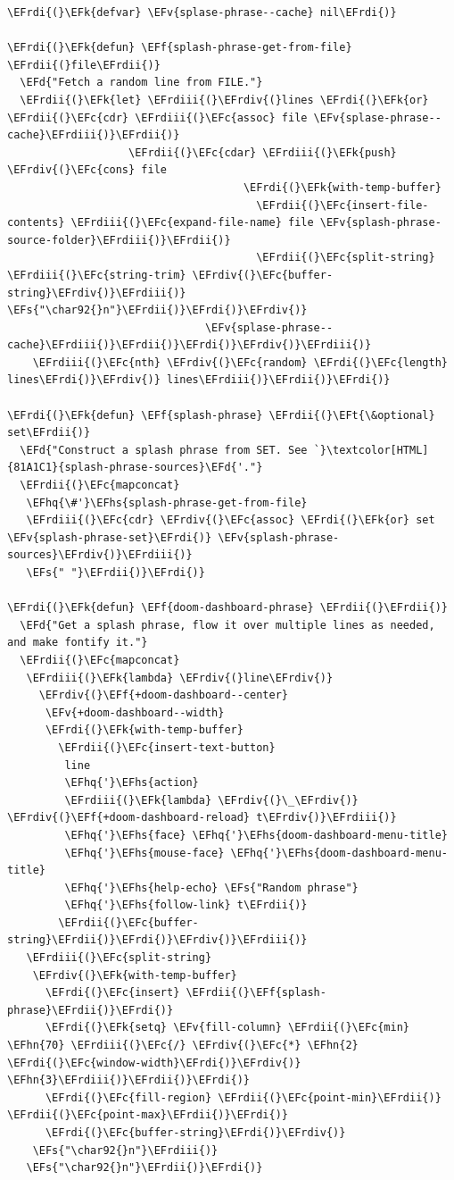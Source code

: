 \documentclass{scrartcl}
\newcommand{\EFk}[1]{\textcolor{EFk}{#1}} %
\newcommand{\EFd}[1]{\textcolor{EFd}{#1}} %
\newcommand{\EFt}[1]{\textcolor{EFt}{#1}} %
\newcommand{\EFs}[1]{\textcolor{EFs}{#1}} %
\newcommand{\EFc}[1]{\textcolor{EFc}{#1}} %
\newcommand{\EFv}[1]{\textcolor{EFv}{#1}} %
\newcommand{\EFf}[1]{\textcolor{EFf}{#1}} %
\newcommand{\EFhn}[1]{#1} %
\newcommand{\EFhq}[1]{#1} %
\newcommand{\EFhs}[1]{#1} %
\newcommand{\EFrdi}[1]{#1} %
\newcommand{\EFrdii}[1]{#1} %
\newcommand{\EFrdiii}[1]{#1} %
\newcommand{\EFrdiv}[1]{#1} %
\begin{document}
\begin{Code}
\begin{Verbatim}[]
\EFrdi{(}\EFk{defvar} \EFv{splase-phrase--cache} nil\EFrdi{)}

\EFrdi{(}\EFk{defun} \EFf{splash-phrase-get-from-file} \EFrdii{(}file\EFrdii{)}
  \EFd{"Fetch a random line from FILE."}
  \EFrdii{(}\EFk{let} \EFrdiii{(}\EFrdiv{(}lines \EFrdi{(}\EFk{or} \EFrdii{(}\EFc{cdr} \EFrdiii{(}\EFc{assoc} file \EFv{splase-phrase--cache}\EFrdiii{)}\EFrdii{)}
                   \EFrdii{(}\EFc{cdar} \EFrdiii{(}\EFk{push} \EFrdiv{(}\EFc{cons} file
                                     \EFrdi{(}\EFk{with-temp-buffer}
                                       \EFrdii{(}\EFc{insert-file-contents} \EFrdiii{(}\EFc{expand-file-name} file \EFv{splash-phrase-source-folder}\EFrdiii{)}\EFrdii{)}
                                       \EFrdii{(}\EFc{split-string} \EFrdiii{(}\EFc{string-trim} \EFrdiv{(}\EFc{buffer-string}\EFrdiv{)}\EFrdiii{)} \EFs{"\char92{}n"}\EFrdii{)}\EFrdi{)}\EFrdiv{)}
                               \EFv{splase-phrase--cache}\EFrdiii{)}\EFrdii{)}\EFrdi{)}\EFrdiv{)}\EFrdiii{)}
    \EFrdiii{(}\EFc{nth} \EFrdiv{(}\EFc{random} \EFrdi{(}\EFc{length} lines\EFrdi{)}\EFrdiv{)} lines\EFrdiii{)}\EFrdii{)}\EFrdi{)}

\EFrdi{(}\EFk{defun} \EFf{splash-phrase} \EFrdii{(}\EFt{\&optional} set\EFrdii{)}
  \EFd{"Construct a splash phrase from SET. See `}\textcolor[HTML]{81A1C1}{splash-phrase-sources}\EFd{'."}
  \EFrdii{(}\EFc{mapconcat}
   \EFhq{\#'}\EFhs{splash-phrase-get-from-file}
   \EFrdiii{(}\EFc{cdr} \EFrdiv{(}\EFc{assoc} \EFrdi{(}\EFk{or} set \EFv{splash-phrase-set}\EFrdi{)} \EFv{splash-phrase-sources}\EFrdiv{)}\EFrdiii{)}
   \EFs{" "}\EFrdii{)}\EFrdi{)}

\EFrdi{(}\EFk{defun} \EFf{doom-dashboard-phrase} \EFrdii{(}\EFrdii{)}
  \EFd{"Get a splash phrase, flow it over multiple lines as needed, and make fontify it."}
  \EFrdii{(}\EFc{mapconcat}
   \EFrdiii{(}\EFk{lambda} \EFrdiv{(}line\EFrdiv{)}
     \EFrdiv{(}\EFf{+doom-dashboard--center}
      \EFv{+doom-dashboard--width}
      \EFrdi{(}\EFk{with-temp-buffer}
        \EFrdii{(}\EFc{insert-text-button}
         line
         \EFhq{'}\EFhs{action}
         \EFrdiii{(}\EFk{lambda} \EFrdiv{(}\_\EFrdiv{)} \EFrdiv{(}\EFf{+doom-dashboard-reload} t\EFrdiv{)}\EFrdiii{)}
         \EFhq{'}\EFhs{face} \EFhq{'}\EFhs{doom-dashboard-menu-title}
         \EFhq{'}\EFhs{mouse-face} \EFhq{'}\EFhs{doom-dashboard-menu-title}
         \EFhq{'}\EFhs{help-echo} \EFs{"Random phrase"}
         \EFhq{'}\EFhs{follow-link} t\EFrdii{)}
        \EFrdii{(}\EFc{buffer-string}\EFrdii{)}\EFrdi{)}\EFrdiv{)}\EFrdiii{)}
   \EFrdiii{(}\EFc{split-string}
    \EFrdiv{(}\EFk{with-temp-buffer}
      \EFrdi{(}\EFc{insert} \EFrdii{(}\EFf{splash-phrase}\EFrdii{)}\EFrdi{)}
      \EFrdi{(}\EFk{setq} \EFv{fill-column} \EFrdii{(}\EFc{min} \EFhn{70} \EFrdiii{(}\EFc{/} \EFrdiv{(}\EFc{*} \EFhn{2} \EFrdi{(}\EFc{window-width}\EFrdi{)}\EFrdiv{)} \EFhn{3}\EFrdiii{)}\EFrdii{)}\EFrdi{)}
      \EFrdi{(}\EFc{fill-region} \EFrdii{(}\EFc{point-min}\EFrdii{)} \EFrdii{(}\EFc{point-max}\EFrdii{)}\EFrdi{)}
      \EFrdi{(}\EFc{buffer-string}\EFrdi{)}\EFrdiv{)}
    \EFs{"\char92{}n"}\EFrdiii{)}
   \EFs{"\char92{}n"}\EFrdii{)}\EFrdi{)}


\end{Verbatim}
\end{Code}
\end{document}
